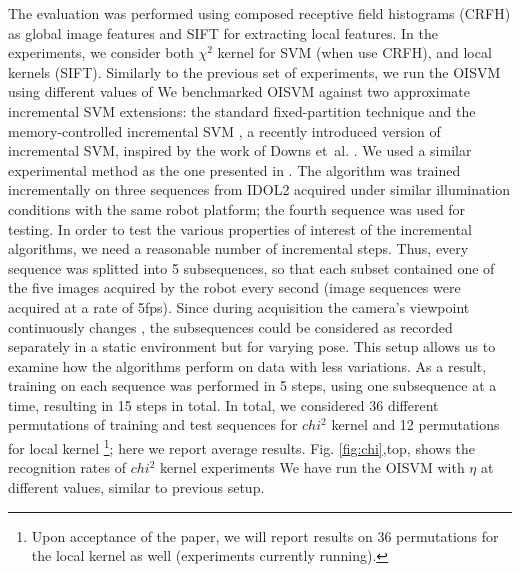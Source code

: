 The evaluation was performed using composed receptive field histograms (CRFH)
\cite{Linde:Lindeberg:ICPR04} as global image features and SIFT \cite{lowe99object}
for extracting local features. In the experiments, we consider both $\chi^2$ kernel
for SVM (when use CRFH), and local kernels \cite{wallraven:iccv03} (SIFT).
Similarly to the previous set of experiments, we run the OISVM using 
different values of %
We benchmarked  OISVM against two approximate incremental SVM extensions:
the standard fixed-partition technique \cite{ijcai99} and the 
memory-controlled incremental
SVM \cite{luo:icra07}, a recently introduced version of incremental SVM, 
 inspired by the work of Downs et~al. \cite{DownsGM01}. 
We used a similar experimental
method as the one presented in \cite{luo:icra07}. 
The algorithm was trained incrementally on
three sequences from IDOL2 acquired under similar illumination conditions 
with the same robot
platform; the fourth sequence was used for testing. In order to test the 
various properties of
interest of the incremental algorithms, we need a reasonable number of 
incremental steps.
Thus, every sequence was splitted into 5 subsequences, so that each subset 
contained one of the
five images acquired by the robot every second (image sequences were acquired 
at a rate of
5fps). Since during acquisition the camera's viewpoint continuously changes 
\cite{luo:icra07},
the subsequences could be considered as recorded separately in a static 
environment but for
varying pose. This setup allows us to examine how the algorithms perform 
on data with less
variations. As a result, training on each sequence was performed in 5 steps, 
using one subsequence
at a time, resulting in 15 steps in total. In total, we considered 36 
different permutations
of training and test sequences for $chi^2$ kernel and 12 permutations for 
local kernel
\footnote{Upon acceptance of the paper, we will report results on 36 permutations for the local kernel as well (experiments currently running).}; here
we report average results. Fig. \ref{fig:chi},top, shows the recognition rates 
of $chi^2$ kernel experiments
We have run the OISVM with $\eta$ at different values, similar to previous setup.

